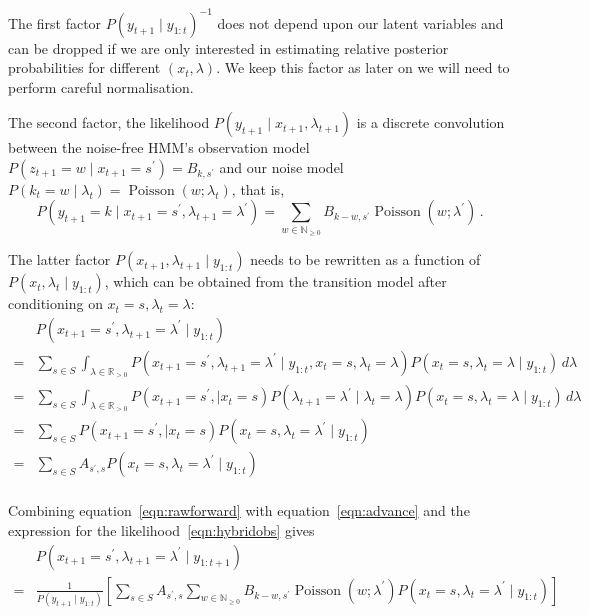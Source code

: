 \documentclass[twoside, 11pt]{article}
\DeclareMathOperator*{\poissond}{Poisson}
\newcommand{\reals}[0] {\mathbb{R}}
\newcommand{\nonnegint}[0] {\mathbb{N}_{\geq 0}}
\begin{document}
The first factor $P(y_{t+1} \mid y_{1:t})^{-1}$ does not depend upon our latent variables and can be dropped if we are only interested in estimating relative posterior probabilities for different $(x_t, \lambda)$. We keep this factor as later on we will need to perform careful normalisation.

The second factor, the likelihood $P(y_{t+1} \mid x_{t+1}, \lambda_{t+1})$ is a discrete convolution between the noise-free HMM's observation model $P(z_{t+1}=w \mid x_{t+1}=s^{\prime}) = B_{k,s^{\prime}}$ and our noise model $P(k_t=w \mid \lambda_t) = \poissond(w ; \lambda_t)$, that is,
\begin{equation}
P(y_{t+1}=k \mid x_{t+1}=s^{\prime}, \lambda_{t+1}=\lambda^{\prime})
=
\sum_{w \in \nonnegint} B_{k-w,s^{\prime}} \poissond(w ; \lambda^{\prime}) \, .
\end{equation}

The latter factor $P(x_{t+1}, \lambda_{t+1} \mid y_{1:t})$ needs to be rewritten as a function of $P(x_{t}, \lambda_{t} \mid y_{1:t})$, which can be obtained from the transition model after conditioning on $x_t=s, \lambda_t=\lambda$:
\begin{align}
& P(x_{t+1}=s^{\prime}, \lambda_{t+1}=\lambda^{\prime} \mid y_{1:t}) \nonumber \\
= & \sum_{s \in S} \int_{\lambda \in \reals_{>0}}
P(x_{t+1}=s^{\prime}, \lambda_{t+1}=\lambda^{\prime} \mid y_{1:t}, x_t=s, \lambda_t=\lambda ) P(x_t=s, \lambda_t=\lambda \mid y_{1:t} ) \,d\lambda \nonumber \\
= & \sum_{s \in S} \int_{\lambda \in \reals_{>0}}
P(x_{t+1}=s^{\prime}, \mid x_t=s)
P(\lambda_{t+1}=\lambda^{\prime} \mid \lambda_t=\lambda ) P(x_t=s, \lambda_t=\lambda \mid y_{1:t} ) \,d\lambda \nonumber \\
= & \sum_{s \in S}
P(x_{t+1}=s^{\prime}, \mid x_t=s)
P(x_t=s, \lambda_t=\lambda^{\prime} \mid y_{1:t} ) \nonumber \\
= & \sum_{s \in S}
A_{s^{\prime}, s}
P(x_t=s, \lambda_t=\lambda^{\prime} \mid y_{1:t} ) \nonumber \\
\label{eqn:advance}
\end{align}

Combining equation~\ref{eqn:rawforward} with equation~\ref{eqn:advance} and the expression for the likelihood~\ref{eqn:hybridobs} gives
\begin{align}
& P(x_{t+1}=s^{\prime}, \lambda_{t+1}=\lambda^{\prime} \mid y_{1:{t+1}}) \nonumber \\
= &
\frac{1}{P(y_{t+1} \mid y_{1:t})}
\left[
\sum_{s \in S}
A_{s^{\prime}, s}
\sum_{w \in \nonnegint}
B_{k-w,s^{\prime}} \poissond(w ; \lambda^{\prime})
P(x_t=s, \lambda_t=\lambda^{\prime} \mid y_{1:t} )
\right]
\end{align}
\end{document}

